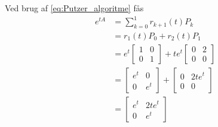 \begin{eks}
    Ved brug af \eqref{eq:Putzer_algoritme} fås
    \begin{align*}
        e^{tA}  &= \sum_{k=0}^{1}r_{k+1}(t) P_k \\
                &= r_1(t)P_0 + r_2(t)P_1\\
                &= e^t  \begin{bmatrix}
                            1 & 0\\
                            0 & 1
                        \end{bmatrix} 
                 +te^t  \begin{bmatrix}
                            0 & 2\\
                            0 & 0
                        \end{bmatrix}\\
                &=      \begin{bmatrix}
                            e^t & 0\\
                            0 & e^t
                        \end{bmatrix}
                    +   \begin{bmatrix}
                            0 & 2te^t\\
                            0 & 0
                        \end{bmatrix}\\
                &=  \begin{bmatrix}
                        e^t & 2te^t\\
                        0   & e^t
                    \end{bmatrix}
    \end{align*}    
\end{eks}